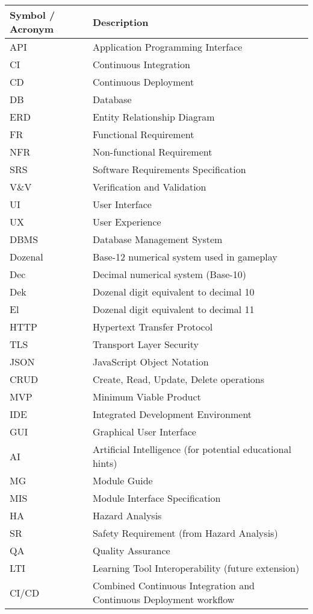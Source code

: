 \documentclass[12pt, titlepage]{article}
\begin{document}
\renewcommand{\arraystretch}{1.2}
\begin{tabularx}{\textwidth}{l X}
\toprule
\textbf{Symbol / Acronym} & \textbf{Description} \\
\midrule
API & Application Programming Interface \\
CI & Continuous Integration \\
CD & Continuous Deployment \\
DB & Database \\
ERD & Entity Relationship Diagram \\
FR & Functional Requirement \\
NFR & Non-functional Requirement \\
SRS & Software Requirements Specification \\
V\&V & Verification and Validation \\
UI & User Interface \\
UX & User Experience \\
DBMS & Database Management System \\
Dozenal & Base-12 numerical system used in gameplay \\
Dec & Decimal numerical system (Base-10) \\
Dek & Dozenal digit equivalent to decimal 10 \\
El & Dozenal digit equivalent to decimal 11 \\
HTTP & Hypertext Transfer Protocol \\
TLS & Transport Layer Security \\
JSON & JavaScript Object Notation \\
CRUD & Create, Read, Update, Delete operations \\
MVP & Minimum Viable Product \\
IDE & Integrated Development Environment \\
GUI & Graphical User Interface \\
AI & Artificial Intelligence (for potential educational hints) \\
MG & Module Guide \\
MIS & Module Interface Specification \\
HA & Hazard Analysis \\
SR & Safety Requirement (from Hazard Analysis) \\
QA & Quality Assurance \\
LTI & Learning Tool Interoperability (future extension) \\
CI/CD & Combined Continuous Integration and Continuous Deployment workflow \\
\bottomrule
\end{tabularx}
\end{document}
